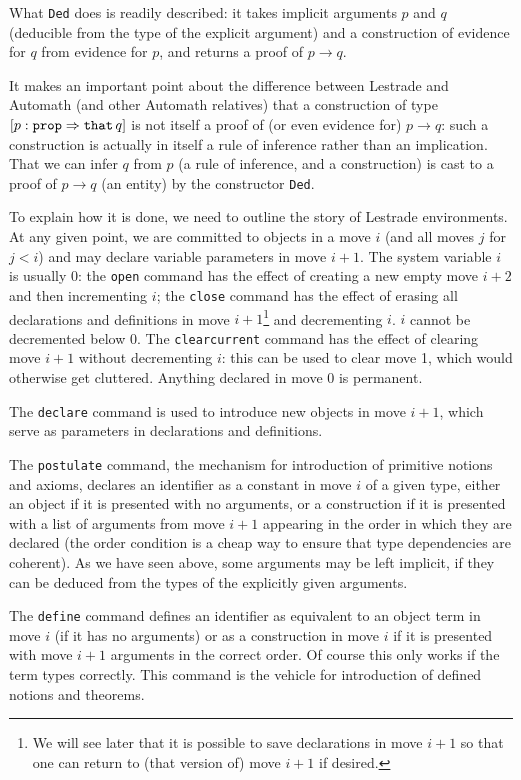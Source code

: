 \documentclass[12pt]{article}
\begin{document}
What {\tt Ded} does is readily described:  it takes implicit arguments $p$ and $q$ (deducible from the type of the explicit argument) and a construction of evidence for $q$ from evidence for $p$, and returns a proof of $p \rightarrow q$.

It makes an important point about the difference between Lestrade and Automath (and other Automath relatives) that a construction of type \newline $[p:{\tt prop} \Rightarrow {\tt that} \,q]$ is not itself a proof of (or even evidence for) $p \rightarrow q$:  such a construction is actually in itself a rule of inference rather than an implication.  That we can infer $q$ from $p$ (a rule of inference, and a construction) is cast to a proof of $p\rightarrow q$ (an entity) by the constructor {\tt Ded}.

To explain how it is done, we need to outline the story of Lestrade environments.  At any given point, we are committed to objects in a move $i$ (and all moves $j$ for $j<i$) and may declare variable parameters in
move $i+1$.  The system variable $i$ is usually 0:  the {\tt open} command has the effect of creating a new empty move $i+2$ and then incrementing $i$;  the {\tt close} command has
the effect of erasing all declarations and definitions in move $i+1$\footnote{We will see later that it is possible to save declarations in move $i+1$ so that one can return to (that version of) move $i+1$ if desired.} and decrementing $i$.  $i$ cannot be decremented below 0.  The {\tt clearcurrent} command has the effect
of clearing move $i+1$ without decrementing $i$:  this can be used to clear move 1, which would otherwise get cluttered.  Anything declared in move 0 is permanent.

The {\tt declare} command is used to introduce new objects in move $i+1$, which serve as parameters in declarations and definitions.

The {\tt postulate} command, the mechanism for introduction of primitive notions and axioms,  declares an identifier as a constant in move $i$ of a given type, either an object if it is presented with no arguments, or a construction if it is presented
with a list of arguments from move $i+1$ appearing in the order in which they are declared (the order condition is  a cheap way to ensure that type dependencies are coherent).  As we have seen above, some arguments may be left implicit, if they can be deduced from the types of the explicitly given arguments.

The {\tt define} command defines an identifier as equivalent to an object term in move $i$ (if it has no arguments) or as a construction in move $i$ if it is presented with
move $i+1$ arguments in the correct order.   Of course this only works if the term types correctly.  This command is the vehicle for introduction of defined notions and theorems.
\end{document}
